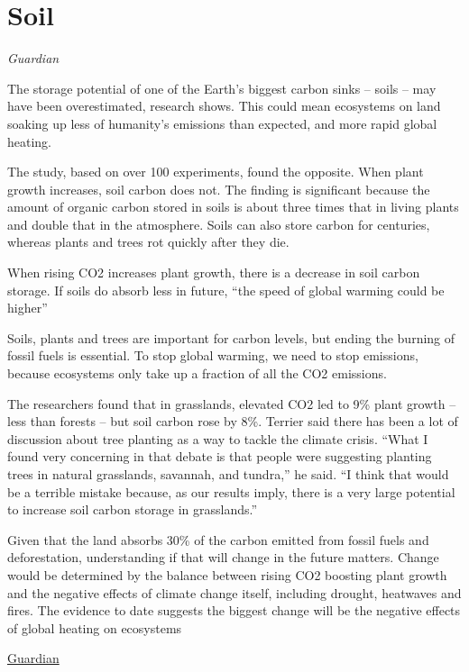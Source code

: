 \documentclass[
]{book}
\begin{document}
\hypertarget{soil}{%
\chapter{Soil}\label{soil}}

\emph{Guardian}

The storage potential of one of the Earth's biggest carbon sinks -- soils -- may have been overestimated, research shows. This could mean ecosystems on land soaking up less of humanity's emissions than expected, and more rapid global heating.

The study, based on over 100 experiments, found the opposite. When plant growth increases, soil carbon does not. The finding is significant because the amount of organic carbon stored in soils is about three times that in living plants and double that in the atmosphere. Soils can also store carbon for centuries, whereas plants and trees rot quickly after they die.

When rising CO2 increases plant growth, there is a decrease in soil carbon storage.
If soils do absorb less in future, ``the speed of global warming could be higher''

Soils, plants and trees are important for carbon levels,
but ending the burning of fossil fuels is essential.
To stop global warming, we need to stop emissions,
because ecosystems only take up a fraction of all the CO2 emissions.

The researchers found that in grasslands, elevated CO2 led to 9\% plant growth -- less than forests -- but soil carbon rose by 8\%. Terrier said there has been a lot of discussion about tree planting as a way to tackle the climate crisis. ``What I found very concerning in that debate is that people were suggesting planting trees in natural grasslands, savannah, and tundra,'' he said. ``I think that would be a terrible mistake because, as our results imply, there is a very large potential to increase soil carbon storage in grasslands.''

Given that the land absorbs 30\% of the carbon emitted from fossil fuels and deforestation, understanding if that will change in the future matters.
Change would be determined by the balance between rising CO2 boosting plant growth and the negative effects of climate change itself, including drought, heatwaves and fires. The evidence to date suggests the biggest change will be the negative effects of global heating on ecosystems

\href{https://www.theguardian.com/environment/2021/mar/24/soils-ability-to-absorb-carbon-emissions-may-be-overestimated-study}{Guardian}
\end{document}
